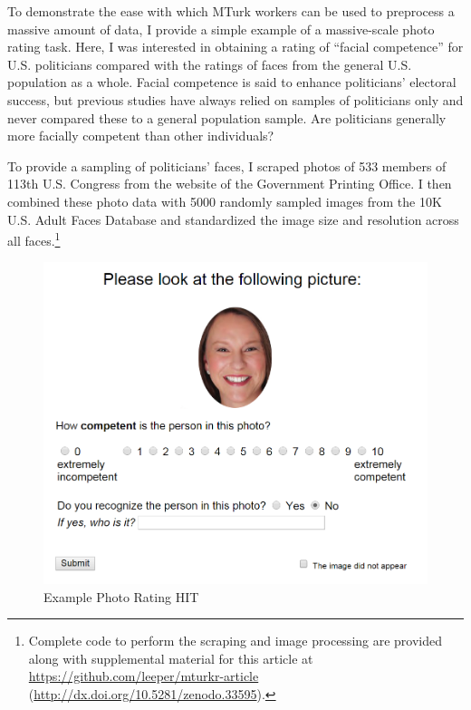 To demonstrate the ease with which MTurk workers can be used to preprocess a massive amount of data, I provide a simple example of a massive-scale photo rating task. Here, I was interested in obtaining a rating of ``facial competence'' for U.S. politicians compared with the ratings of faces from the general U.S. population as a whole. Facial competence is said to enhance politicians' electoral success, but previous studies have always relied on samples of politicians only and never compared these to a general population sample. Are politicians generally more facially competent than other individuals?

To provide a sampling of politicians' faces, I scraped photos of 533 members of 113th U.S. Congress from the website of the Government Printing Office. I then combined these photo data with 5000 randomly sampled images from the 10K U.S. Adult Faces Database \citep{BainbridgeIsolaOliva2013} and standardized the image size and resolution across all faces.\footnote{Complete code to perform the scraping and image processing are provided along with supplemental material for this article at \url{https://github.com/leeper/mturkr-article} (\url{http://dx.doi.org/10.5281/zenodo.33595}).}

\begin{figure}
\begin{center}
\includegraphics[width=\textwidth]{hit2}
\end{center}
\caption{Example Photo Rating HIT}\label{fig:hit2}
\end{figure}

